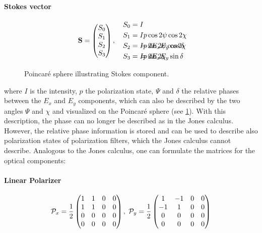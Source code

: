 \paragraph{Stokes vector}
\begin{align}
% 
\vec{S} =
\begin{pmatrix} S_0 \\ S_1 \\ S_2 \\ S_3\end{pmatrix} , \quad
% 
\begin{split}
S_0 &= I \\
S_1 &= I p \cos 2\psi \cos 2\chi \\
S_2 &= I p \sin 2\psi \cos 2\chi \\
S_3 &= I p \sin 2\chi
\end{split}
% 
\hspace{-7em}
% 
\begin{split}
& \\
& \\
&= 2 E_x E_y \cos \delta \\
&= 2 E_x E_y \sin \delta
\end{split}
\end{align}
%
\begin{figure}[!t]
\centering
{}
\caption{Poincar\'{e} sphere illustrating Stokes component.}
\label{fig:stokesPoincare}
\end{figure}
%
where $I$ is the intensity, $p$ the polarization state, $\Psi$ and $\delta$ the relative phases between the $E_x$ and $E_y$ components, which can also be described by the two angles $\Psi$ and $\chi$ and visualized on the Poincar\'{e} sphere (see \cref{fig:stokesPoincare}).
With this description, the phase can no longer be described as in the Jones calculus.
However, the relative phase information is stored and can be used to describe also polarization states of polarization filters, which the Jones calculus cannot describe.
Analogous to the Jones calculus, one can formulate the matrices for the optical components:
%
\paragraph{Linear Polarizer}
\begin{align}
\mathcal{P}_x=\frac{1}{2}
\begin{pmatrix}
    1 & 1 & 0 & 0 \\
    1 & 1 & 0 & 0 \\
    0 & 0 & 0 & 0 \\
    0 & 0 & 0 & 0
  \end{pmatrix}
, \;
\mathcal{P}_y=\frac{1}{2}
\begin{pmatrix}
     1 & -1 & 0 & 0 \\
    -1 &  1 & 0 & 0 \\
     0 &  0 & 0 & 0 \\
     0 &  0 & 0 & 0
\end{pmatrix}
\end{align}
%
